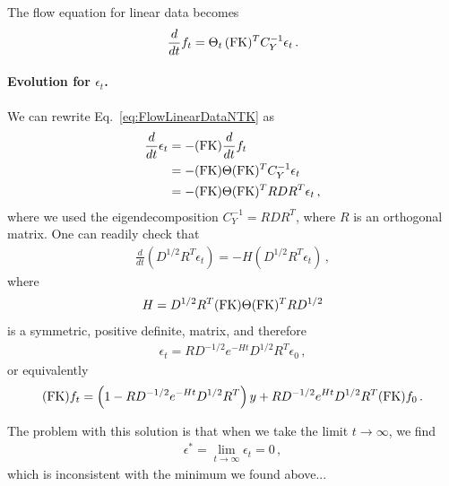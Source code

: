 \documentclass[11pt]{article}
\begin{document}
The flow equation for linear data becomes
\begin{align}
    \label{eq:FlowLinearDataNTK}
    \frac{d}{dt} f_t = 
        \Theta_t\, (\mathrm{FK})^T C_Y^{-1} \epsilon_t\, .
\end{align}

\paragraph{Evolution for $\epsilon_t$.}
We can rewrite Eq.~\ref{eq:FlowLinearDataNTK} as 
\begin{align}
    \label{eq:FlowLinearDataNTKEpsilon}
    \frac{d}{dt} \epsilon_t &= - (\mathrm{FK}) \frac{d}{dt} f_t \nonumber \\
        &= - (\mathrm{FK}) \Theta (\mathrm{FK})^T C_Y^{-1} \epsilon_t \nonumber \\
        &= - (\mathrm{FK}) \Theta (\mathrm{FK})^T R D R^T \epsilon_t\, ,
\end{align}
where we used the eigendecomposition $C_Y^{-1} = R D R^T$, where $R$ is an orthogonal matrix. 
One can readily check that 
\begin{align}
     \frac{d}{dt} \left(D^{1/2} R^T \epsilon_t\right) = 
        - H \left(D^{1/2} R^T \epsilon_t\right)\, ,
\end{align}
where 
\begin{align}
    \label{eq:HSymmetricDef}
    H = D^{1/2} R^T (\mathrm{FK}) \Theta (\mathrm{FK})^T R D^{1/2}
\end{align}
is a symmetric, positive definite, matrix, and therefore
\begin{align}
    \label{eq:SolutionForEpsilon}
    \epsilon_t = R D^{-1/2} e^{-H t} D^{1/2} R^T \epsilon_0\, ,
\end{align}
or equivalently
\begin{align}
    \label{eq:SolutionForFKf}
    (\mathrm{FK}) f_t = 
        \left( 1 - R D^{-1/2} e^{-Ht} D^{1/2} R^T\right) y + 
            R D^{-1/2} e^{H t} D^{1/2} R^T (\mathrm{FK}) f_0\, .
\end{align}

The problem with this solution is that when we take the limit $t\to\infty$, we find
\begin{align}
    \label{eq:EpsilonFlowed} 
    \epsilon^* = \lim_{t\to\infty} \epsilon_t = 0\, ,   
\end{align}
which is inconsistent with the minimum we found above... 

\end{document}

